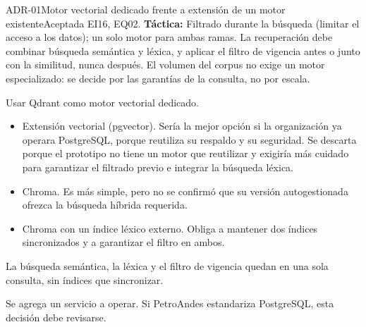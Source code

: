 \begin{adr}{ADR-01}{Motor vectorial dedicado frente a extensión de un motor existente}{Aceptada}
 EI16, EQ02. \textbf{Táctica:} Filtrado durante la búsqueda (limitar el acceso a los datos); un solo motor para ambas ramas.
La recuperación debe combinar búsqueda semántica y léxica, y aplicar el filtro de vigencia antes o junto con la similitud,
nunca después. El volumen del corpus no exige un motor especializado: se decide por las garantías de la consulta, no por escala.

Usar Qdrant como motor vectorial dedicado.

\begin{itemize}
  \item Extensión vectorial (pgvector). Sería la mejor opción si la organización ya operara PostgreSQL, porque reutiliza su
  respaldo y su seguridad. Se descarta porque el prototipo no tiene un motor que reutilizar y exigiría más cuidado para garantizar
  el filtrado previo e integrar la búsqueda léxica.
  \item Chroma. Es más simple, pero no se confirmó que su versión autogestionada ofrezca la búsqueda híbrida requerida.
  \item Chroma con un índice léxico externo. Obliga a mantener dos índices sincronizados y a garantizar el filtro en ambos.
\end{itemize}

La búsqueda semántica, la léxica y el filtro de vigencia quedan en una sola consulta, sin índices que sincronizar.

Se agrega un servicio a operar. Si PetroAndes estandariza PostgreSQL, esta decisión debe revisarse.
\end{adr}

